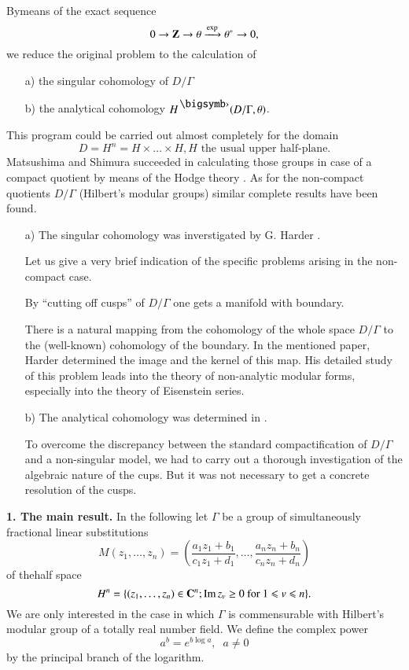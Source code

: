 By\pageoriginale means of the exact sequence
$$
0 \to \mathbf{Z} \to \theta \xrightarrow{\exp} \theta^\ast \to 0,
$$
we reduce the original problem to the calculation of 
\begin{itemize}
\item[a)] the singular cohomology of $D/\Gamma$

\item[b)] the analytical cohomology $H^{\bigdot} (D/\Gamma , \theta)$.
\end{itemize}
This program could be carried out almost completely for the domain
$$
D = H^n = H \times \ldots \times H, H \text{ the usual upper half-plane.}
$$
Matsushima and Shimura succeeded in calculating those groups in case of a compact quotient by means of the Hodge theory \cite{art2-key3}. As for the non-compact quotients $D/\Gamma$ (Hilbert's modular groups) similar complete results have been found.
\begin{itemize}
\item[a)] The singular cohomology was inverstigated by G. Harder \cite{art2-key2}. 

Let us give a very brief indication of the specific problems arising in the non-compact case.

By ``cutting off cusps'' of $D/\Gamma$ one gets a manifold with boundary.

There is a natural mapping from the cohomology of the whole space $D/\Gamma$ to the (well-known) cohomology of the boundary. In the mentioned paper, Harder determined the image and the kernel of this map. His detailed study of this problem leads into the theory of non-analytic modular forms, especially into the theory of Eisenstein series.

\item[b)] The analytical cohomology was determined in \cite{art2-key1}.

To overcome the discrepancy between the standard compactification of $D/ \Gamma$ and a non-singular model, we had to carry out a thorough investigation of the algebraic nature of the cups. But it was not necessary to get a concrete resolution of the cusps.
\end{itemize}

\noindent
\textbf{1. The main result.}
In the following let $\Gamma$ be a group of simultaneously fractional linear substitutions
$$
M (z_1, \ldots, z_n) = \left(\frac{a_1 z_1 + b_1}{c_1 z_1 + d_1} , \ldots, \frac{a_n z_n + b_n}{c_n z_n + d_n} \right)
$$
of the\pageoriginale half space
$$
H^n = \{(z_1, \ldots , z_n) \in \mathbf{C}^n ;  \operatorname{Im} z_v \geq 0 \text{ for } 1 \leqslant v \leqslant n \}.
$$
We are only interested in the case in which $\Gamma$ is commensurable with Hilbert's modular group of a totally real number field. We define the complex power
$$
a^b = e^{b \log a}, \;\; a \neq  0
$$
by the principal branch of the logarithm.

